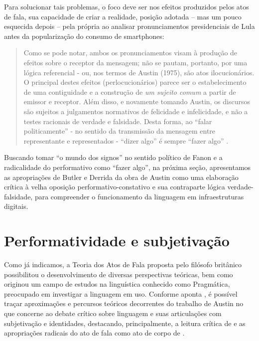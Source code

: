 \documentclass[portuguese]{textolivre}
\begin{document}
Para solucionar tais problemas, o foco deve ser nos efeitos produzidos pelos atos de fala, sua capacidade de criar a realidade, posição adotada – mas um pouco esquecida depois – pela própria \textcite{cesarino2007reencontro} ao analisar pronunciamentos presidenciais de Lula antes da popularização do consumo de smartphones:

\begin{quote}
    Como se pode notar, ambos os pronunciamentos visam à produção de efeitos sobre o receptor da mensagem; não se pautam, portanto, por uma lógica referencial - ou, nos termos de Austin (1975), são atos ilocucionários. O principal destes efeitos (perlocucionários) parece ser o estabelecimento de uma contiguidade e a construção de \textit{um sujeito comum} a partir de emissor e receptor. Além disso, e novamente tomando Austin, os discursos são sujeitos a julgamentos normativos de felicidade e infelicidade, e não a testes racionais de verdade e falsidade. Desta forma, ao “falar politicamente” - no sentido da transmissão da mensagem entre representante e representados - “dizer algo” é sempre “fazer algo” \cite[p. 193, grifos da autora]{cesarino2007reencontro}.
\end{quote}

Buscando tomar “o mundo dos signos” no sentido político de Fanon e a radicalidade do performativo como “fazer algo”, na próxima seção, apresentamos as apropriações de Butler e Derrida da obra de Austin como uma elaboração crítica à velha oposição performativo-constativo e sua contraparte lógica verdade-falsidade, para compreender o funcionamento da linguagem em infraestruturas digitais.

\section{Performatividade e subjetivação}\label{sec-fmt-manuscrito}
Como já indicamos, a Teoria dos Atos de Fala proposta pelo filósofo britânico possibilitou o desenvolvimento de diversas perspectivas teóricas, bem como originou um campo de estudos na linguística conhecido como Pragmática, preocupado em investigar a linguagem em uso. Conforme aponta \textcite{pinto2007conexoes,pinto2009corpo}, é possível traçar aproximações e percursos teóricos decorrentes do trabalho de Austin no que concerne ao debate crítico sobre linguagem e suas articulações com subjetivação e identidades, destacando, principalmente, a leitura crítica de \textcite{derrida1990limited} e as apropriações radicais do ato de fala como ato de corpo de \textcite{felman1980scandale,butler1997excitable,butler1999gender}.
\end{document}
